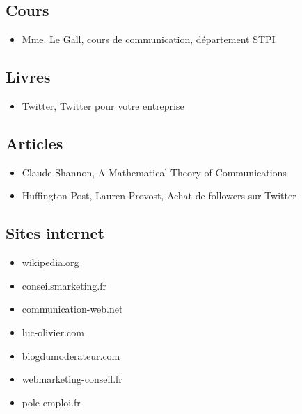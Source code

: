 \subsection{Cours}
\begin{itemize}
	\item Mme. Le Gall, cours de communication, département STPI
\end{itemize}
\subsection{Livres}
\begin{itemize}
	\item Twitter, Twitter pour votre entreprise
\end{itemize}
\subsection{Articles}
\begin{itemize}
	\item Claude Shannon, A Mathematical Theory of Communications
	\item Huffington Post, Lauren Provost, Achat de followers sur Twitter
\end{itemize}
\subsection{Sites internet}
\begin{itemize}
\item wikipedia.org
\item conseilsmarketing.fr
\item communication-web.net
\item luc-olivier.com
\item blogdumoderateur.com
\item webmarketing-conseil.fr
\item pole-emploi.fr
\end{itemize}

